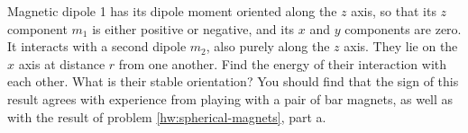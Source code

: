 Magnetic dipole 1 has its dipole moment oriented along the $z$ axis, so that
its $z$ component $m_1$ is either positive or negative, and its $x$ and $y$ components
are zero. It interacts with a second dipole $m_2$, also purely along the $z$ axis.
They lie on the $x$ axis at distance $r$ from one another. Find the energy of their
interaction with each other. What is their stable orientation? You should find
that the sign of this result agrees with experience from playing with a pair of bar magnets,
as well as with the result of problem \ref{hw:spherical-magnets}, part a.\answercheck
